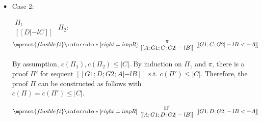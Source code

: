 \begin{itemize}
\item Case 2:
      \begin{center}
        \scriptsize
        \begin{math}
          \begin{array}{c}
            \Pi_1 \\
            {[[D |-l C]]}
          \end{array}
        \end{math}
        \qquad\qquad
        $\Pi_2$:
        \begin{math}
          $$\mprset{flushleft}
          \inferrule* [right={\tiny impR}] {
            {
              \begin{array}{c}
                \pi \\
                {[[A; G1; C; G2 |-l B]]}
              \end{array}
            }
          }{[[G1; C; G2 |-l B <- A]]}
        \end{math}
      \end{center}
      By assumption, $c(\Pi_1),c(\Pi_2)\leq |C|$. By induction on $\Pi_1$
      and $\pi$, there is a proof $\Pi'$ for sequent
      $[[G1; D; G2; A |-l B]]$ s.t. $c(\Pi') \leq |C|$. Therefore, the
      proof $\Pi$ can be constructed as follows with \\
      $c(\Pi) = c(\Pi') \leq |C|$.
      \begin{center}
        \scriptsize
        \begin{math}
          $$\mprset{flushleft}
          \inferrule* [right={\tiny impR}] {
            {
              \begin{array}{c}
                \Pi' \\
                {[[A; G1; D; G2 |-l B]]}
              \end{array}
            }
          }{[[G1; D; G2 |-l B <- A]]}
        \end{math}
      \end{center}
\end{itemize}



